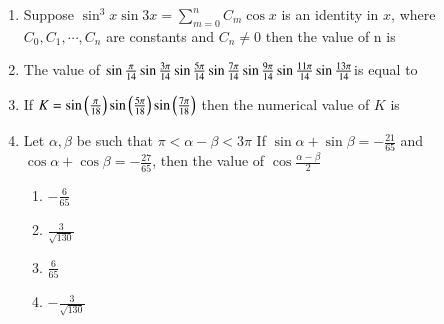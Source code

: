 \begin{enumerate}[label=\thesubsection.\arabic*,ref=\thesubsection.\theenumi]
    \item Suppose $\sin^3{x}\sin3x = \sum_{m=0}^{n} C_m \cos x $ is an identity in $x$, where $C_0, C_1, \cdots , C_n$ are constants and $C_n \neq 0$ then the value of n is
        \hfill{}
    \item The value of
        $\sin\frac{\pi}{14}\sin\frac{3\pi}{14}\sin\frac{5\pi}{14}\sin\frac{7\pi}{14}
        \\ \sin\frac{9\pi}{14}\sin\frac{11\pi}{14}\sin\frac{13\pi}{14} $is equal to  

        \hfill{}



    \item If $K = \sin\left(\frac{\pi}{18}\right)\sin\left(\frac{5\pi}{18}\right)\sin\left(\frac{7\pi}{18}\right)$ then the numerical value of $K$ is  
        \hfill{}

\item Let $\alpha,\beta$ be such that $\pi<\alpha-\beta<3\pi$
If $\sin\alpha+\sin\beta=-\frac{21}{65}$ and $\cos\alpha+\cos\beta=-\frac{27}{65}$, then the value of $\cos\frac{\alpha-\beta}{2}$\hfill{}
\begin{multicols}{2} 
\begin{enumerate}
\item $-\frac{6}{65}$
\item $\frac{3}{\sqrt{130}}$
\columnbreak
\item $\frac{6}{65}$
\item $-\frac{3}{\sqrt{130}}$
\end{enumerate} 
\end{multicols}
\end{enumerate}
